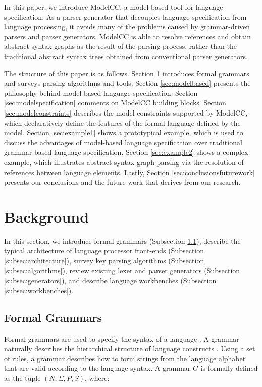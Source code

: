 \documentclass[preprint]{elsarticle}
\begin{document}
In this paper, we introduce ModelCC, a model-based tool for language specification.
As a parser generator that decouples language specification from language processing, it avoids many of the problems caused by grammar-driven parsers and parser generators.
ModelCC is able to resolve references and obtain abstract syntax graphs as the result of the parsing process, rather than the traditional abstract syntax trees obtained from conventional parser generators.

The structure of this paper is as follows.
Section \ref{sec:background} introduces formal grammars and surveys parsing algorithms and tools.
Section \ref{sec:modelbased} presents the philosophy behind model-based language specification.
Section \ref{sec:modelspecification} comments on ModelCC building blocks.
Section \ref{sec:modelconstraints} describes the model constraints supported by ModelCC, which declaratively define the features of the formal language defined by the model.
Section \ref{sec:example1} shows a prototypical example, which is used to discuss the advantages of model-based language specification over traditional grammar-based language specification.
Section \ref{sec:example2} shows a complex example, which illustrates abstract syntax graph parsing via the resolution of references between language elements.
Lastly, Section \ref{sec:conclusionsfuturework} presents our conclusions and the future work that derives from our research.

\section{Background} \label{sec:background}

In this section, we introduce formal grammars (Subsection \ref{subsec:formalgrammars}), describe the typical architecture of language processor front-ends (Subsection \ref{subsec:architecture}), survey key parsing algorithms (Subsection \ref{subsec:algorithms}), review existing lexer and parser generators (Subsection \ref{subsec:generators}), and describe language workbenches (Subsection \ref{subsec:workbenches}).

\subsection{Formal Grammars} \label{subsec:formalgrammars}

Formal grammars are used to specify the syntax of a language \cite{Ginsburg1975,Harrison1978}.
A grammar naturally describes the hierarchical structure of language constructs \cite{Aho2006}.
Using a set of rules, a grammar describes how to form strings from the language alphabet that are valid according to the language syntax.
A grammar $G$ is formally defined \cite{Chomsky1956} as the tuple $(N,\Sigma,P,S)$, where:
\end{document}
